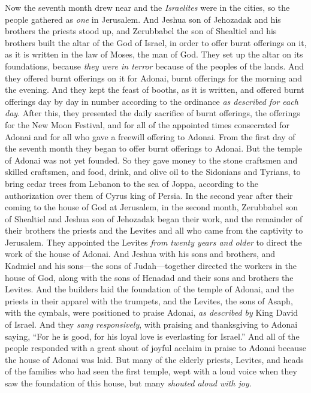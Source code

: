 \begin{biblechapter} %
 Now the seventh month drew near and the \textit{Israelites} were in the cities, so the people gathered as \textit{one} in Jerusalem.
\verse And Jeshua son of Jehozadak and his brothers the priests stood up, and Zerubbabel the son of Shealtiel and his brothers built the altar of the God of Israel, in order to offer burnt offerings on it, as it is written in the law of Moses, the man of God.
\verse They set up the altar on its foundations, because \textit{they were in terror} because of the peoples of the lands. And they offered burnt offerings on it for Adonai, burnt offerings for the morning and the evening.
\verse And they kept the feast of booths, as it is written, and offered burnt offerings day by day in number according to the ordinance \textit{as described for each day}.
\verse After this, they presented the daily sacrifice of burnt offerings, the offerings for the New Moon Festival, and for all of the appointed times consecrated for Adonai and for all who gave a freewill offering to Adonai.
\verse From the first day of the seventh month they began to offer burnt offerings to Adonai. But the temple of Adonai was not yet founded.
\verse So they gave money to the stone craftsmen and skilled craftsmen, and food, drink, and olive oil to the Sidonians and Tyrians, to bring cedar trees from Lebanon to the sea of Joppa, according to the authorization over them of Cyrus king of Persia.
 In the second year after their coming to the house of God at Jerusalem, in the second month, Zerubbabel son of Shealtiel and Jeshua son of Jehozadak began their work, and the remainder of their brothers the priests and the Levites and all who came from the captivity to Jerusalem. They appointed the Levites \textit{from twenty years and older} to direct the work of the house of Adonai.
\verse And Jeshua with his sons and brothers, and Kadmiel and his sons—the sons of Judah—together directed the workers in the house of God, along with the sons of Henadad and their sons and brothers the Levites.
\verse And the builders laid the foundation of the temple of Adonai, and the priests in their apparel with the trumpets, and the Levites, the sons of Asaph, with the cymbals, were positioned to praise Adonai, \textit{as described by} King David of Israel.
\verse And they \textit{sang responsively}, with praising and thanksgiving to Adonai saying, “For he is good, for his loyal love is everlasting for Israel.”
\verse And all of the people responded with a great shout of joyful acclaim in praise to Adonai because the house of Adonai was laid.
\verse But many of the elderly priests, Levites, and heads of the families who had seen the first temple, wept with a loud voice when they saw the foundation of this house, but many \textit{shouted aloud with joy}.
\end{biblechapter}

